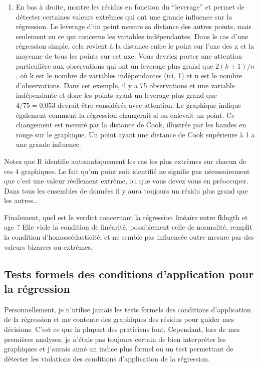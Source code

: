 \documentclass[12pt,]{book}
\makeatletter
\newenvironment{kframe}{%
\medskip{}
\setlength{\fboxsep}{.8em}
\def\at@end@of@kframe{}%
\ifinner\ifhmode%
 \def\at@end@of@kframe{\end{minipage}}%
 \begin{minipage}{\columnwidth}%
\fi\fi%
\def\FrameCommand##1{\hskip\@totalleftmargin \hskip-\fboxsep
\colorbox{incolor}{##1}\hskip-\fboxsep
    \hskip-\linewidth \hskip-\@totalleftmargin \hskip\columnwidth}%
\MakeFramed {\advance\hsize-\width
  \@totalleftmargin\z@ \linewidth\hsize
  \@setminipage}}%
{\par\unskip\endMakeFramed%
\at@end@of@kframe}
\newenvironment{rmdblock}[1]
 {
 \begin{itemize}
 \renewcommand{\labelitemi}{
   \raisebox{-.7\height}[0pt][0pt]{
     {\setkeys{Gin}{width=3em,keepaspectratio}\texttt{[image: images/\#1]}}
   }
 }
 \begin{kframe}
 \setlength{\fboxsep}{1em}
 \item
 }
 {
 \end{kframe}
 \end{itemize}
 }
\newenvironment{rmdwarning}
  {\begin{rmdblock}{warning}}
  {\end{rmdblock}}
\makeatother
\begin{document}
\begin{enumerate}
\item
  En bas à droite, montre les résidus en fonction du ``leverage'' et permet de détecter certaines valeurs extrêmes qui ont une grande influence sur la régression. Le leverage d'un point mesure sa distance des autres points, mais seulement en ce qui concerne les variables indépendantes. Dans le cas d'une régression simple, cela revient à la distance entre le point sur l'axe des x et la moyenne de tous les points sur cet axe. Vous devriez porter une attention particulière aux observations qui ont un leverage plus grand que \(2(k+1)/n\), où k est le nombre de variables indépendantes (ici, 1) et n est le nombre d'observations. Dans cet exemple, il y a 75 observations et une variable indépendante et donc les points ayant un leverage plus grand que \(4 / 75 = 0.053\) devrait être considérés avec attention. Le graphique indique également comment la régression changerait si on enlevait un point. Ce changement est mesuré par la distance de Cook, illustrée par les bandes en rouge sur le graphique. Un point ayant une distance de Cook supérieure à 1 a une grande influence.
\end{enumerate}

\begin{rmdwarning}
Notez que R identifie automatiquement les cas les plus extrèmes sur chacun de ces 4 graphiques. Le fait qu'un point soit identifié ne signifie pas nécessairement que c'est une valeur réellement extrème, ou que vous devez vous en préoccuper. Dans tous les ensembles de données il y aura toujours un résidu plus grand que les autres\ldots{}
\end{rmdwarning}

Finalement, quel est le verdict concernant la régression linéaire entre fklngth et age ? Elle viole la condition de linéarité, possiblement celle de normalité, remplit la condition d'homoscédasticité, et ne semble pas influencée outre mesure par des valeurs bizarres ou extrêmes.

\hypertarget{tests-formels-des-conditions-dapplication-pour-la-ruxe9gression}{%
\subsection{Tests formels des conditions d'application pour la régression}\label{tests-formels-des-conditions-dapplication-pour-la-ruxe9gression}}

Personnellement, je n'utilise jamais les tests formels des conditions d'application de la régression et me contente des graphiques des résidus pour guider mes décisions. C'est ce que la plupart des praticiens font. Cependant, lors de mes premières analyses, je n'étais pas toujours certain de bien interpréter les graphiques et j'aurais aimé un indice plus formel ou un test permettant de détecter les violations des conditions d'application de la régression.
\end{document}
